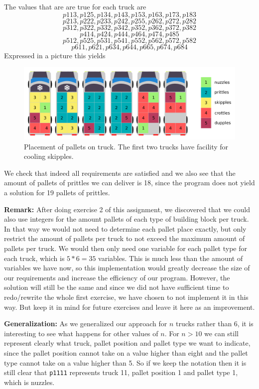 \documentclass[a4paper]{article}
\begin{document}
The values that are are true for each truck are 
\[p113, p125, p134, p143, p153, p163, p173, p183 \]
\[p213, p222, p233, p242, p255, p262, p272, p282 \]
\[p312, p322, p332, p342, p352, p362, p372, p382 \]
\[p414, p424, p444, p464, p474, p485 \]
\[p512, p525, p531, p541, p552, p562, p572, p582 \]
\[p611, p621, p634, p644, p665, p674, p684 \]
Expressed in a picture this yields

\begin{figure}[H]
			\centering
				\includegraphics[scale=1]{trucks.png}
			\caption{Placement of pallets on truck. The first two trucks have facility for cooling skipples.}
		\end{figure}

We check that indeed all requirements are satisfied and we also see that the amount of pallets of prittles we can deliver is 18, since the program does not yield a solution for 19 pallets of prittles.

{\bf Remark:}
After doing exercise 2 of this assignment, we discovered that we could also use integers for the amount pallets of each type of building block per truck. In that way we would not need to determine each pallet place exactly, but only restrict the amount of pallets per truck to not exceed the maximum amount of pallets per truck. We would then only need one variable for each pallet type for each truck, which is $5*6=35$ variables. This is much less than the amount of variables we have now, so this implementation would greatly decrease the size of our requirements and increase the efficiency of our program. However, the solution will still be the same and since we did not have sufficient time to redo/rewrite the whole first exercise, we have chosen to not implement it in this way. But keep it in mind for future exercises and leave it here as an improvement.

\vspace{3mm}

{\bf Generalization:} 
As we generalized our approach for $n$ trucks rather than 6, it is interesting to see what happens for other values of $n$. For $n > 10$ we can still represent clearly what truck, pallet position and pallet type we want to indicate, since the pallet position cannot take on a value higher than eight and the pallet type cannot take on a value higher than 5. So if we keep the notation then it is still clear that {\tt p1111} represents truck 11, pallet position 1 and pallet type 1, which is nuzzles.
\end{document}
